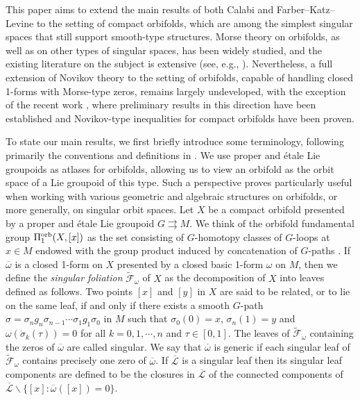 \documentclass[
  a4paper, 
  reqno, 
  oneside, 
  12pt
]{amsart}
\theoremstyle{definition}
\theoremstyle{remark}
\newcommand{\rr}{\rightrightarrows}
\begin{document}
This paper aims to extend the main results of both Calabi and Farber--Katz--Levine to the setting of compact orbifolds, which are among the simplest singular spaces that still support smooth-type structures. Morse theory on orbifolds, as well as on other types of singular spaces, has been widely studied, and the existing literature on the subject is extensive (see, e.g., \cite{ChoHong,Corrigan,GM,Hep,HolmMatsu,LT,OV}). Nevertheless, a full extension of Novikov theory to the setting of orbifolds, capable of handling closed 1-forms with Morse-type zeros, remains largely undeveloped, with the exception of the recent work \cite{V}, where preliminary results in this direction have been established and Novikov-type inequalities for compact orbifolds have been proven.

To state our main results, we first briefly introduce some terminology, following primarily the conventions and definitions in \cite{V}. We use proper and étale Lie groupoids as atlases for orbifolds, allowing us to view an orbifold as the orbit space of a Lie groupoid of this type. Such a  perspective proves particularly useful when working with various geometric and algebraic structures on orbifolds, or more generally, on singular orbit spaces. Let $X$ be a compact orbifold presented by a proper and étale Lie groupoid $G\rr M$. We think of the orbifold fundamental group $\Pi_1^\textnormal{orb}(X,[x])$ as the set consisting of $G$-homotopy classes of $G$-loops at $x\in M$ endowed with the group product induced by concatenation of $G$-paths \cite{BH,MoMr}. If $\overline{\omega}$ is a closed 1-form on $X$ presented by a closed basic 1-form $\omega$ on $M$, then we define the \emph{singular foliation} $\tilde{\mathcal{F}}_\omega$ of $X$ as the decomposition of $X$ into leaves defined as follows. Two points $[x]$ and $[y]$ in $X$ are said to be related, or to lie on the same leaf, if and only if there exists a smooth $G$-path $\sigma=\sigma_ng_n\sigma_{n-1}\cdots \sigma_1g_1\sigma_0$ in $M$ such that $\sigma_0(0)=x$, $\sigma_n(1)=y$ and $\omega(\dot{\sigma}_k(\tau))=0$ for all $k=0,1,\cdots,n$ and $\tau\in [0,1]$. The leaves of $\tilde{\mathcal{F}}_\omega$ containing the zeros of $\overline{\omega}$ are called singular. We say that $\overline{\omega}$ is generic if each singular leaf of $\tilde{\mathcal{F}}_\omega$ contains precisely one zero of $\overline{\omega}$. If $\overline{\mathcal{L}}$ is a singular leaf then its singular leaf components are defined to be the closures in $\overline{\mathcal{L}}$ of the connected components of $\overline{\mathcal{L}}\backslash  \lbrace [x]: \overline{\omega}([x])=0\rbrace$.
\end{document}
